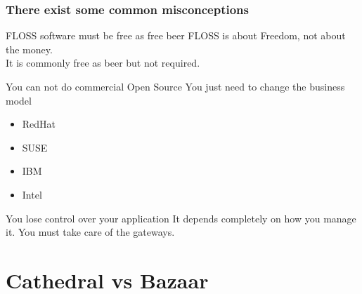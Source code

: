 \documentclass[hyperref={pdfpagelabels=false},xcolor=pst,pdf,fragile]{beamer}
\begin{document}
\begin{frame}
  \frametitle{There exist some common misconceptions}

  \begin{block}{FLOSS software must be free as free beer}
	  FLOSS is about Freedom, not about the money.\\

	  It is commonly free as beer but not required.
  \end{block}

  \pause
  \begin{block}{You can not do commercial Open Source}
	  You just need to change the business model
	\begin{itemize}
	  \item RedHat
	  \item SUSE
	  \item IBM
	  \item Intel
	\end{itemize}
  \end{block}

  \pause
  \begin{block}{You lose control over your application}
	It depends completely on how you manage it. You must take care of the
	gateways.
  \end{block}

\end{frame}

\section{Cathedral vs Bazaar}
\end{document}
